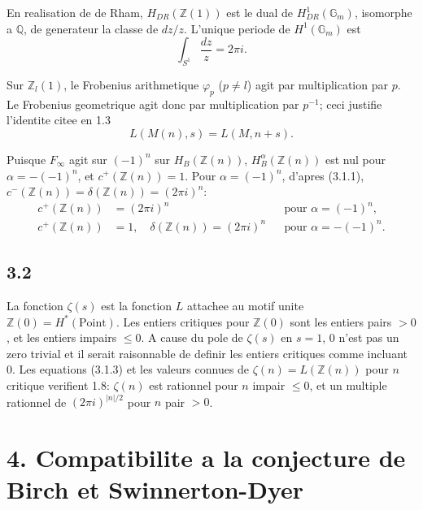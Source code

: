 \documentclass[12pt,a4paper]{article}
\theoremstyle{plain}
\theoremstyle{definition}
\theoremstyle{remark}
\newcommand{\Q}{\mathbb{Q}}
\newcommand{\Z}{\mathbb{Z}}
\begin{document}
En realisation de de Rham, $H_{DR}(\Z(1))$ est le dual de $H^1_{DR}(\mathbb{G}_m)$, isomorphe a
$\Q$, de generateur la classe de $dz/z$. L'unique periode de $H^1(\mathbb{G}_m)$ est
\begin{equation}\label{eq:3.1.1}
\int_{S^1} \frac{dz}{z} = 2\pi i.
\end{equation}

Sur $\Z_l(1)$, le Frobenius arithmetique $\varphi_p$ ($p \neq l$) agit par multiplication par $p$. Le
Frobenius geometrique agit donc par multiplication par $p^{-1}$; ceci justifie l'identite
citee en 1.3
\begin{equation}\label{eq:3.1.2}
L(M(n), s) = L(M, n+s).
\end{equation}

Puisque $F_\infty$ agit sur $(-1)^n$ sur $H_B(\Z(n))$, $H^\alpha_B(\Z(n))$ est nul pour
$\alpha = -(-1)^n$, et $c^+(\Z(n)) = 1$. Pour $\alpha = (-1)^n$, d'apres (3.1.1),
$c^-(\Z(n)) = \delta(\Z(n)) = (2\pi i)^n$:
\begin{equation}\label{eq:3.1.3}
\begin{aligned}
c^+(\Z(n)) &= (2\pi i)^n &&\text{pour } \alpha = (-1)^n,\\
c^+(\Z(n)) &= 1, \quad \delta(\Z(n)) = (2\pi i)^n &&\text{pour } \alpha = -(-1)^n.
\end{aligned}
\end{equation}

\subsection*{3.2}

La fonction $\zeta(s)$ est la fonction $L$ attachee au motif unite $\Z(0) = H^*(\text{Point})$.
Les entiers critiques pour $\Z(0)$ sont les entiers pairs $> 0$, et les entiers impairs
$\leq 0$. A cause du pole de $\zeta(s)$ en $s = 1$, $0$ n'est pas un zero trivial et il serait
raisonnable de definir les entiers critiques comme incluant $0$. Les equations (3.1.3)
et les valeurs connues de $\zeta(n) = L(\Z(n))$ pour $n$ critique verifient 1.8:
$\zeta(n)$ est rationnel pour $n$ impair $\leq 0$, et un multiple rationnel de $(2\pi i)^{|n|/2}$
pour $n$ pair $> 0$.


\section*{4. Compatibilite a la conjecture de Birch et Swinnerton-Dyer}
\end{document}
